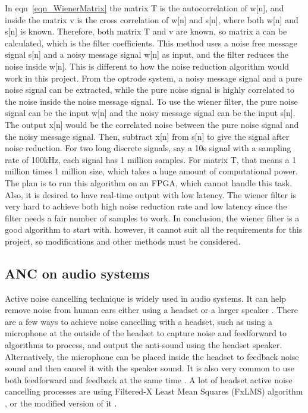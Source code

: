 In eqn~\ref{eqn_WienerMatrix} the matrix T is the autocorrelation of w[n], and inside the matrix v is the cross correlation of w[n] and s[n], where both w[n] and s[n] is known.  Therefore, both matrix T and v are known, so matrix a can be calculated, which is the filter coefficients.
This method uses a noise free message signal s[n] and a noisy message signal w[n] as input, and the filter reduces the noise inside w[n].  This is different to how the noise reduction algorithm would work in this project.  From the optrode system, a noisy message signal and a pure noise signal can be extracted, while the pure noise signal is highly correlated to the noise inside the noise message signal.  To use the wiener filter, the pure noise signal can be the input w[n] and the noisy message signal can be the input s[n].  The output x[n] would be the correlated noise between the pure noise signal and the noisy message signal.  Then, subtract x[n] from s[n] to give the signal after noise reduction.
For two long discrete signals, say a 10s signal with a sampling rate of 100kHz, each signal has 1 million samples.  For matrix T, that means a 1 million times 1 million size, which takes a huge amount of computational power.  The plan is to run this algorithm on an FPGA, which cannot handle this task.  Also, it is desired to have real-time output with low latency.  The wiener filter is very hard to achieve both high noise reduction rate and low latency since the filter needs a fair number of samples to work.
In conclusion, the wiener filter is a good algorithm to start with.  however, it cannot suit all the requirements for this project, so modifications and other methods must be considered.



\subsection{ANC on audio systems}

Active noise cancelling technique is widely used in audio systems.  It can help remove noise from human ears either using a headset \cite{ANC_Headphone_10} or a larger speaker \cite{ANC_Car}.  There are a few ways to achieve noise cancelling with a headset, such as using a microphone at the outside of the headset to capture noise and feedforward \cite{ANC_Headphone_8} to algorithms to process, and output the anti-sound using the headset speaker.  Alternatively, the microphone can be placed inside the headset to feedback \cite{ANC_Headphone_5} noise sound and then cancel it with the speaker sound.  It is also very common to use both feedforward and feedback at the same time \cite{ANC_Headphone_4}.  
A lot of headset active noise cancelling processes \cite{ANC_Headphone_1}\cite{ANC_Headphone_2} are using Filtered-X Least Mean Squares (FxLMS) algorithm \cite{ANC_Headphone_7}, or the modified version of it \cite{ANC_Headphone_9}\cite{ANC_Headphone_6}.

